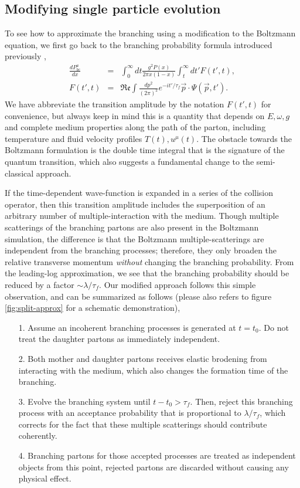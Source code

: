 \subsection{Modifying single particle evolution}
To see how to approximate the branching using a modification to the Boltzmann equation, we first go back to the branching probability formula introduced previously \cite{CaronHuot:2010bp},
\begin{eqnarray}
\frac{dP^{a}_{bc}}{dx} &=& \int_0^\infty dt \frac{g^2 P(x)}{2\pi x (1-x) } \int_t^\infty dt'  F(t', t),
\label{eq:full-theory}
\\
F(t', t) &=& \mathfrak{Re} \int \frac{dp^2}{(2\pi)^2} e^{-it'/\tau_f} \vec{p}\cdot \Psi(\vec{p}, t').
\end{eqnarray}
We have abbreviate the transition amplitude by the notation $F(t', t)$ for convenience, but always keep in mind this is a quantity that depends on $E, \omega, g$ and complete medium properties along the path of the parton, including temperature and fluid velocity profiles $T(t), u^\mu(t)$.
The obstacle towards the Boltzmann formulation is the double time integral that is the signature of the quantum transition, which also suggests a fundamental change to the semi-classical approach.

If the time-dependent wave-function is expanded in a series of the collision operator, then this transition amplitude includes the superposition of an arbitrary number of multiple-interaction with the medium.
Though multiple scatterings of the branching partons are also present in the Boltzmann simulation, the difference is that the Boltzmann multiple-scatterings are independent from the branching processes; therefore, they only broaden the relative transverse momentum {\it without} changing the branching probability.
From the leading-log approximation, we see that the branching probability should be reduced by a factor $\sim \lambda/\tau_f$.
Our modified approach follows this simple observation, and can be summarized as follows (please also refers to figure \ref{fig:split-approx} for a schematic demonstration),
\begin{itemize}
\item[1.] Assume an incoherent branching processes is generated at $t=t_0$. Do not treat the daughter partons as immediately independent.
\item[2.] Both mother and daughter partons receives elastic brodening from interacting with the medium, which also changes the formation time of the branching.
\item[3.] Evolve the branching system until $t-t_0 > \tau_f$. Then, reject this branching process with an acceptance probability that is proportional to $\lambda/\tau_f$, which corrects for the fact that these multiple scatterings should contribute coherently.
\item[4.] Branching partons for those accepted processes are treated as independent objects from this point, rejected partons are discarded without causing any physical effect.
\end{itemize}

